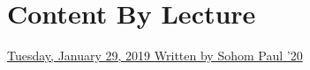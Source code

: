 \section*{Content By Lecture}

\hyperref[02-0129]{Tuesday, January 29, 2019 \hfill Written by Sohom Paul '20}